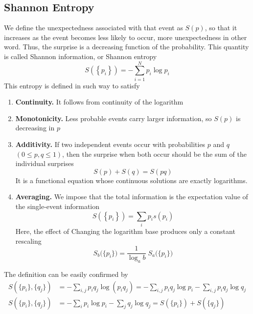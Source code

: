 \documentclass[../../../main.tex]{subfiles}
\begin{document}
\subsection{Shannon Entropy}
We define the unexpectedness associated with that event as $S(p)$, so that it increases as the event becomes less likely to occur, more unexpectedness in other word.
Thus, the surprise is a decreasing function of the probability.
This quantity is called Shannon information, or Shannon entropy
\begin{equation*}
  S(\left\{ p_i \right\} ) = -\sum_{i=1}^{N} p_i \log p_i
\end{equation*}
This entropy is defined in such way to satisfy
\begin{enumerate}
  \item \textbf{Continuity.}
        It follows from continuity of the logarithm
  \item \textbf{Monotonicity.}
        Less probable events carry larger information, so $S(p)$ is decreasing in $p$
  \item \textbf{Additivity.}
        If two independent events occur with probabilities \( p \) and \( q \) \((0 \leq p, q \leq 1)\), then the surprise when both occur should be the sum of the individual surprises
        \begin{equation*}
          S(p) + S(q) = S(pq)
        \end{equation*}
        It is a functional equation whose continuous solutions are exactly logarithms.
  \item \textbf{Averaging.}
        We impose that the total information is the expectation value of the single-event information
        \begin{equation*}
          S(\left\{ p_i \right\} ) = \sum_{i } p_i  s(p_i)
        \end{equation*}
        Here, the effect of Changing the logarithm base produces only a constant rescaling
        \begin{equation*}
          S_b\bigl(\{p_i\}\bigr) = \frac{1}{\log_a b}\; S_a\bigl(\{p_i\}\bigr)
        \end{equation*}
\end{enumerate}

The definition can be easily confirmed by
\begin{align*}
  S(\{p_i\}, \{q_j\}) & = -\sum_{i,j} p_i q_j \log (p_i q_j) = -\sum_{i,j} p_i q_j \log p_i - \sum_{i,j} p_i q_j \log q_j \\
  S(\{p_i\}, \{q_j\}) & = -\sum_i p_i \log p_i - \sum_j q_j \log q_j = S(\{p_i\}) + S(\{q_j\})
\end{align*}
\end{document}
